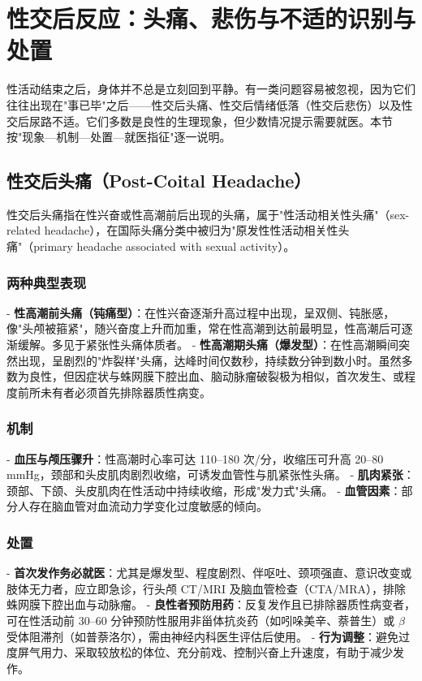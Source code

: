 \section{性交后反应：头痛、悲伤与不适的识别与处置}

性活动结束之后，身体并不总是立刻回到平静。有一类问题容易被忽视，因为它们往往出现在"事已毕"之后——性交后头痛、性交后情绪低落（性交后悲伤）以及性交后尿路不适。它们多数是良性的生理现象，但少数情况提示需要就医。本节按"现象—机制—处置—就医指征"逐一说明。

\subsection{性交后头痛（Post-Coital Headache）}

性交后头痛指在性兴奋或性高潮前后出现的头痛，属于"性活动相关性头痛"（sex-related headache），在国际头痛分类中被归为"原发性性活动相关性头痛"（primary headache associated with sexual activity）。

\subsubsection{两种典型表现}

- \textbf{性高潮前头痛（钝痛型）}：在性兴奋逐渐升高过程中出现，呈双侧、钝胀感，像"头颅被箍紧"，随兴奋度上升而加重，常在性高潮到达前最明显，性高潮后可逐渐缓解。多见于紧张性头痛体质者。
- \textbf{性高潮期头痛（爆发型）}：在性高潮瞬间突然出现，呈剧烈的"炸裂样"头痛，达峰时间仅数秒，持续数分钟到数小时。虽然多数为良性，但因症状与蛛网膜下腔出血、脑动脉瘤破裂极为相似，首次发生、或程度前所未有者必须首先排除器质性病变。

\subsubsection{机制}

- \textbf{血压与颅压骤升}：性高潮时心率可达 110--180 次/分，收缩压可升高 20--80 mmHg，颈部和头皮肌肉剧烈收缩，可诱发血管性与肌紧张性头痛。
- \textbf{肌肉紧张}：颈部、下颌、头皮肌肉在性活动中持续收缩，形成"发力式"头痛。
- \textbf{血管因素}：部分人存在脑血管对血流动力学变化过度敏感的倾向。

\subsubsection{处置}

- \textbf{首次发作务必就医}：尤其是爆发型、程度剧烈、伴呕吐、颈项强直、意识改变或肢体无力者，应立即急诊，行头颅 CT/MRI 及脑血管检查（CTA/MRA），排除蛛网膜下腔出血与动脉瘤。
- \textbf{良性者预防用药}：反复发作且已排除器质性病变者，可在性活动前 30--60 分钟预防性服用非甾体抗炎药（如吲哚美辛、萘普生）或 $\beta$ 受体阻滞剂（如普萘洛尔），需由神经内科医生评估后使用。
- \textbf{行为调整}：避免过度屏气用力、采取较放松的体位、充分前戏、控制兴奋上升速度，有助于减少发作。

